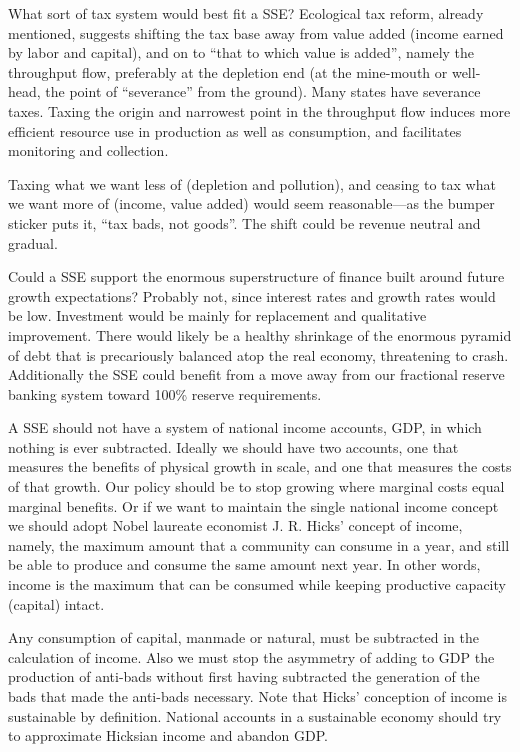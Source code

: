 \documentclass[
]{book}
\begin{document}
What sort of tax system would best fit a SSE? Ecological tax reform, already mentioned, suggests shifting the tax base
away from value added (income earned by labor and capital), and on to ``that to which value is added'', namely the
throughput flow, preferably at the depletion end (at the mine-mouth or well-head, the point of ``severance'' from the
ground). Many states have severance taxes. Taxing the origin and narrowest point in the throughput flow induces
more efficient resource use in production as well as consumption, and facilitates monitoring and collection.

Taxing what we want less of (depletion and pollution), and ceasing to tax what we want more of (income, value
added) would seem reasonable---as the bumper sticker puts it, ``tax bads, not goods''. The shift could be revenue
neutral and gradual.

Could a SSE support the enormous superstructure of finance built around future growth expectations? Probably not,
since interest rates and growth rates would be low. Investment would be mainly for replacement and qualitative
improvement. There would likely be a healthy shrinkage of the enormous pyramid of debt that is precariously
balanced atop the real economy, threatening to crash. Additionally the SSE could benefit from a move away from our
fractional reserve banking system toward 100\% reserve requirements.

A SSE should not have a system of national income accounts, GDP, in which nothing is ever subtracted. Ideally we
should have two accounts, one that measures the benefits of physical growth in scale, and one that measures the costs
of that growth. Our policy should be to stop growing where marginal costs equal marginal benefits. Or if we want to
maintain the single national income concept we should adopt Nobel laureate economist J. R. Hicks' concept of
income, namely, the maximum amount that a community can consume in a year, and still be able to produce and
consume the same amount next year. In other words, income is the maximum that can be consumed while
keeping productive capacity (capital) intact.

Any consumption of capital, manmade or natural, must be subtracted in the calculation of income. Also we
must stop the asymmetry of adding to GDP the production of anti-bads without first having subtracted the generation
of the bads that made the anti-bads necessary. Note that Hicks' conception of income is sustainable by definition.
National accounts in a sustainable economy should try to approximate Hicksian income and abandon GDP.
\end{document}
